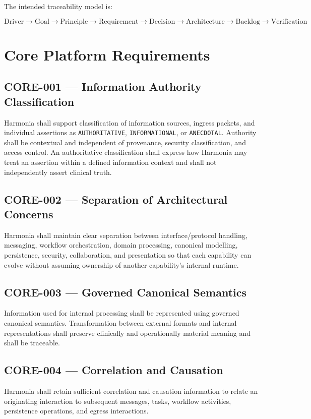 The intended traceability model is:

\begin{equation*}
\text{Driver} \rightarrow
\text{Goal} \rightarrow
\text{Principle} \rightarrow
\text{Requirement} \rightarrow
\text{Decision} \rightarrow
\text{Architecture} \rightarrow
\text{Backlog} \rightarrow
\text{Verification}
\end{equation*}

\section{Core Platform Requirements}

\subsection{CORE-001 --- Information Authority Classification}
Harmonia shall support classification of information sources, ingress packets, and individual assertions as \texttt{AUTHORITATIVE}, \texttt{INFORMATIONAL}, or \texttt{ANECDOTAL}. Authority shall be contextual and independent of provenance, security classification, and access control. An authoritative classification shall express how Harmonia may treat an assertion within a defined information context and shall not independently assert clinical truth.

\subsection{CORE-002 --- Separation of Architectural Concerns}
Harmonia shall maintain clear separation between interface/protocol handling, messaging, workflow orchestration, domain processing, canonical modelling, persistence, security, collaboration, and presentation so that each capability can evolve without assuming ownership of another capability's internal runtime.

\subsection{CORE-003 --- Governed Canonical Semantics}
Information used for internal processing shall be represented using governed canonical semantics. Transformation between external formats and internal representations shall preserve clinically and operationally material meaning and shall be traceable.

\subsection{CORE-004 --- Correlation and Causation}
Harmonia shall retain sufficient correlation and causation information to relate an originating interaction to subsequent messages, tasks, workflow activities, persistence operations, and egress interactions.

